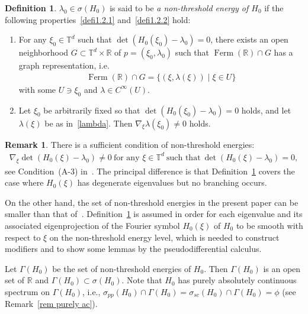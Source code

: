 \documentclass[10pt]{amsart}
\theoremstyle{definition}\newtheorem{defi}[theo]{Definition}\newtheorem{rema}[theo]{Remark}\newtheorem{exam}[theo]{Example}\newtheorem{exem}[theo]{Example}\newtheorem{nota}[theo]{Notation}
\renewcommand{\l}{\lambda}
\newcommand{\x}{\xi}
\newcommand{\s}{\sigma}
\newcommand{\R}{\mathbb{R}}
\newcommand{\T}{\mathbb{T}}
\DeclareMathOperator{\Ferm}{Ferm}
\begin{document}
\begin{defi}\label{nonthr}
$\l_0\in\s(H_0)$ is said to be \emph{a non-threshold energy of $H_0$} if the following properties~\eqref{defi1.2.1} and~\eqref{defi1.2.2} hold:
\begin{enumerate}
\item\label{defi1.2.1} For any $\x_0\in\T^d$ such that $\det(H_0(\x_0)-\l_0)=0$, there exists an open neighborhood $G \subset \T^d \times \R$ of $p=(\x_0,\l_0)$ such that $\Ferm(\R) \cap G$ has a graph representation, i.e.
\begin{align}\label{lambda}
\Ferm(\R) \cap G = \{(\x,\l(\x)) \mid \x\in U \}
\end{align}
with some $U\ni \x_0$ and $\l\in C^\infty(U)$.

\item\label{defi1.2.2} Let $\x_0$ be arbitrarily fixed so that $\det(H_0(\x_0)-\l_0)=0$ holds, and let $\l(\x)$ be as in~\eqref{lambda}. Then $\nabla_\x \l(\x_0) \neq 0$ holds.
\end{enumerate}
\end{defi}

\begin{rema}
There is a sufficient condition of non-threshold energies:
\begin{align*}
\nabla_\x \det(H_0(\x)-\l_0)\neq0 \ \text{for any } \x\in\T^d \ \text{such that} \ \det(H_0(\x)-\l_0)=0,
\end{align*}
see Condition~(A-3) in~\cite[Sections~6~and~7]{An-I-M}. The principal difference is that Definition~\ref{nonthr} covers the case where $H_0(\x)$ has degenerate eigenvalues but no branching occurs.

On the other hand, the set of non-threshold energies in the present paper can be smaller than that of~\cite[Definition~5.5]{P-R}. Definition~\ref{nonthr} is assumed in order for each eigenvalue and its associated eigenprojection of the Fourier symbol $H_0(\x)$ of $H_0$ to be smooth with respect to $\x$ on the non-threshold energy level, which is needed to construct modifiers and to show some lemmas by the pseudodifferential calculus.
\end{rema}

Let $\Gamma(H_0)$ be the set of non-threshold energies of $H_0$. Then $\Gamma(H_0)$ is an open set of $\R$ and $\Gamma(H_0) \subset \s(H_0)$. Note that $H_0$ has purely absolutely continuous spectrum on $\Gamma(H_0)$, i.e., $\s_{pp}(H_0)\cap \Gamma(H_0)=\s_{sc}(H_0)\cap \Gamma(H_0)=\phi$ (see Remark~\ref{rem purely ac}).
\end{document}
